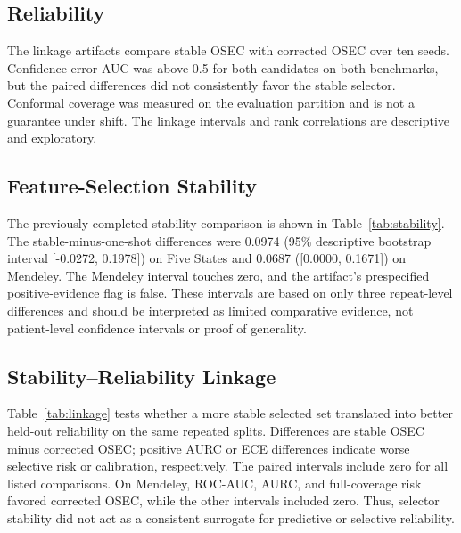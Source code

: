 \documentclass[journal]{IEEEtran}
\begin{document}


\subsection{Reliability}
The linkage artifacts compare stable OSEC with corrected OSEC over ten seeds.
Confidence-error AUC was above 0.5 for both candidates on both benchmarks, but
the paired differences did not consistently favor the stable selector.
Conformal coverage was measured on the evaluation partition and is not a
guarantee under shift. The linkage intervals and rank correlations are
descriptive and exploratory.

\begin{table}[t]
\centering
\caption{Ten-seed internal selective-reliability summaries from the
finite-sample-corrected linkage artifacts, rerun over seeds 42--51. Paired
differences and descriptive bootstrap intervals are reported in
Table~\ref{tab:linkage}; these are internal source-side estimates, not
independent external-validation results. The table reports both macro-bin and
sample-weighted ECE.}
\label{tab:uncertainty}

\end{table}

\subsection{Feature-Selection Stability}
The previously completed stability comparison is shown in
Table~\ref{tab:stability}. The stable-minus-one-shot differences were 0.0974
(95\% descriptive bootstrap interval [-0.0272, 0.1978]) on Five States and
0.0687 ([0.0000, 0.1671]) on Mendeley. The Mendeley interval touches zero,
and the artifact's prespecified positive-evidence flag is false. These
intervals are based on only three repeat-level differences and should be
interpreted as limited comparative evidence, not patient-level confidence
intervals or proof of generality.

\begin{table}[t]
\centering
\caption{Post-boundary-corrected feature-selection stability. $\Phi$ is the
Nogueira chance-corrected stability statistic; intervals summarize the three
repeat-level paired differences and are exploratory.}
\label{tab:stability}

\end{table}

\subsection{Stability--Reliability Linkage}
Table~\ref{tab:linkage} tests whether a more stable selected set translated into
better held-out reliability on the same repeated splits. Differences are
stable OSEC minus corrected OSEC; positive AURC or ECE differences indicate
worse selective risk or calibration, respectively. The paired intervals include
zero for all listed comparisons. On Mendeley, ROC-AUC, AURC, and
full-coverage risk favored corrected OSEC, while the other intervals included
zero. Thus, selector stability did not act as a consistent surrogate for
predictive or selective reliability.
\end{document}
